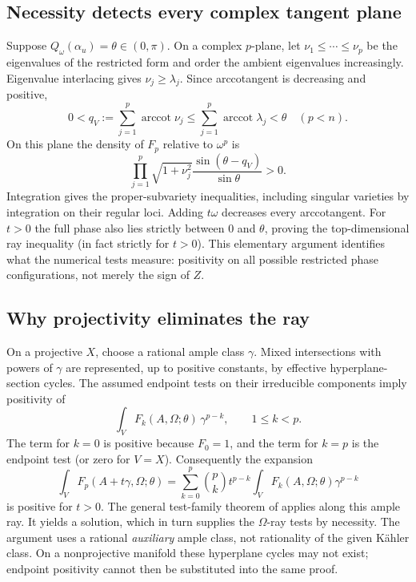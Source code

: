 \documentclass[12pt,reqno]{amsart}
\newcommand{\arccot}{\operatorname{arccot}}
\begin{document}
\subsection{Necessity detects every complex tangent plane}
Suppose $Q_\omega(\alpha_u)=\theta\in(0,\pi)$. On a complex $p$-plane, let $\nu_1\leq\cdots\leq\nu_p$ be the eigenvalues of the restricted form and order the ambient eigenvalues increasingly. Eigenvalue interlacing gives $\nu_j\geq\lambda_j$. Since arccotangent is decreasing and positive,
\[
 0<q_V:=\sum_{j=1}^p\arccot\nu_j
 \leq\sum_{j=1}^p\arccot\lambda_j<\theta\quad(p<n).
\]
On this plane the density of $F_p$ relative to $\omega^p$ is
\begin{equation}\label{eq:sine}
 \prod_{j=1}^p\sqrt{1+\nu_j^2}
       \frac{\sin(\theta-q_V)}{\sin\theta}>0.
\end{equation}
Integration gives the proper-subvariety inequalities, including singular varieties by integration on their regular loci. Adding $t\omega$ decreases every arccotangent. For $t>0$ the full phase also lies strictly between $0$ and $\theta$, proving the top-dimensional ray inequality (in fact strictly for $t>0$). This elementary argument identifies what the numerical tests measure: positivity on all possible restricted phase configurations, not merely the sign of $Z$.

\subsection{Why projectivity eliminates the ray}
On a projective $X$, choose a rational ample class $\gamma$. Mixed intersections with powers of $\gamma$ are represented, up to positive constants, by effective hyperplane-section cycles. The assumed endpoint tests on their irreducible components imply positivity of
\[
 \int_V F_k(A,\Omega;\theta)\,\gamma^{p-k},\qquad 1\leq k<p.
\]
The term for $k=0$ is positive because $F_0=1$, and the term for $k=p$ is the endpoint test (or zero for $V=X$). Consequently the expansion
\begin{equation}\label{eq:ample-ray}
 \int_V F_p(A+t\gamma,\Omega;\theta)
   =\sum_{k=0}^p\binom pk t^{p-k}
       \int_V F_k(A,\Omega;\theta)\gamma^{p-k}
\end{equation}
is positive for $t>0$. The general test-family theorem of \cite{CLT} applies along this ample ray. It yields a solution, which in turn supplies the $\Omega$-ray tests by necessity. The argument uses a rational \emph{auxiliary} ample class, not rationality of the given K\"ahler class. On a nonprojective manifold these hyperplane cycles may not exist; endpoint positivity cannot then be substituted into the same proof.
\end{document}
